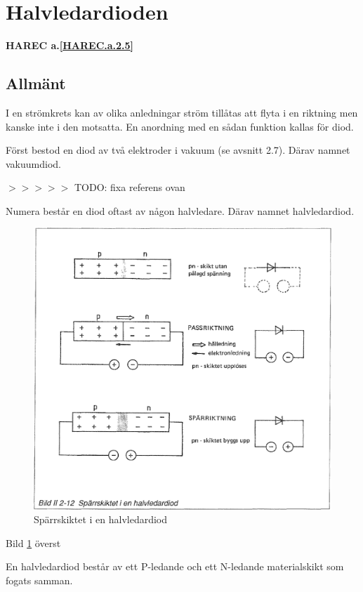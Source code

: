 \section{Halvledardioden}
\textbf{HAREC a.\ref{HAREC.a.2.5}\label{myHAREC.a.2.5}}

\subsection{Allmänt}
I en strömkrets kan av olika anledningar ström tillåtas att flyta i en riktning
men kanske inte i den motsatta. En anordning med en sådan funktion kallas för
diod.

Först bestod en diod av två elektroder i vakuum (se avsnitt 2.7). Därav namnet
vakuumdiod.

$>>>>>$ TODO: fixa referens ovan

Numera består en diod oftast av någon halvledare. Därav namnet halvledardiod.

\begin{figure}[h]
\begin{center}
\includegraphics[width=14cm]{images/bild_2_2-12}
\caption{Spärrskiktet i en halvledardiod}
\label{fig:BildII2-12}
\end{center}
\end{figure}

Bild \ref{fig:BildII2-12} överst

En halvledardiod består av ett P-ledande och ett N-ledande materialskikt som
fogats samman.

